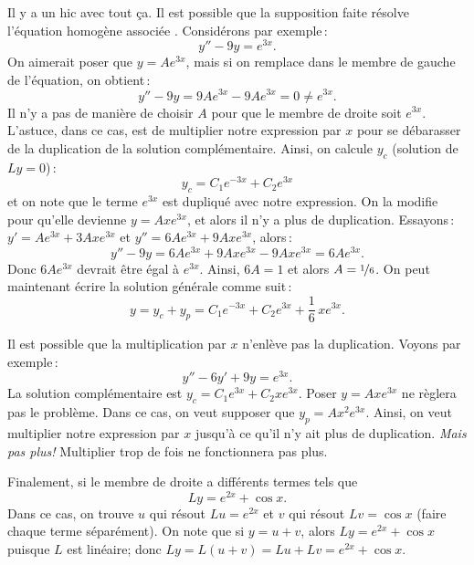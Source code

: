 \medskip

Il y a un hic avec tout ça. Il est possible que la supposition faite résolve l'équation homogène associée .  Considérons par exemple\,: 
\begin{equation*}
y'' - 9y = e^{3x} .
\end{equation*}
On aimerait poser que  $y = Ae^{3x}$, mais si on remplace dans le membre de gauche de l'équation, on obtient\,:  
\begin{equation*}
y''-9y = 9Ae^{3x} - 9Ae^{3x} = 0 \not= e^{3x} .
\end{equation*}
Il n'y a pas de manière de choisir $A$ pour que le membre de droite soit $e^{3x}$.
L'astuce, dans ce cas, est de multiplier notre expression par  $x$ pour se débarasser de la duplication de la solution complémentaire. Ainsi, on calcule  $y_c$ (solution de $Ly =
0$)\,: 
\begin{equation*}
y_c = C_1 e^{-3x} + C_2 e^{3x} 
\end{equation*}
et on note que le terme $e^{3x}$ est dupliqué avec notre expression. On la modifie pour qu'elle devienne  $y = Axe^{3x}$, et alors il n'y a plus de duplication. Essayons\,: 
$y' = Ae^{3x} + 3Axe^{3x}$ et 
$y'' = 6Ae^{3x} + 9Axe^{3x}$, alors\,: 
\begin{equation*}
y'' -9y = 6Ae^{3x} + 9Axe^{3x} - 9Axe^{3x} = 
6Ae^{3x} .
\end{equation*}
Donc $6Ae^{3x}$ devrait être égal à $e^{3x}$.  Ainsi,
$6A = 1$ et alors $A=\nicefrac{1}{6}$.  On peut maintenant écrire la solution générale comme suit\,: 
\begin{equation*}
y = y_c + y_p = 
C_1 e^{-3x} + C_2 e^{3x} + \frac{1}{6}\,xe^{3x} .
\end{equation*}

\medskip

Il est possible que la multiplication  par $x$ n'enlève pas la
duplication.  Voyons par exemple\,: 
\begin{equation*}
y''-6y'+9y = e^{3x} .
\end{equation*}
La solution complémentaire est
$y_c = C_1 e^{3x} + C_2 x e^{3x}$.  Poser $y=A xe^{3x}$
ne règlera pas le problème.  Dans ce cas, on veut supposer que 
$y_p = Ax^2e^{3x}$. Ainsi, on veut multiplier notre expression par  $x$
jusqu'à ce qu'il n'y ait plus de duplication. \emph{Mais pas plus!}  Multiplier trop de fois ne fonctionnera pas plus. 


\medskip

Finalement, si le membre de droite a différents termes tels que 
\begin{equation*}
Ly = e^{2x} + \cos x .
\end{equation*}
Dans ce cas, on trouve  $u$ qui résout $Lu = e^{2x}$ et $v$ qui résout $Lv = \cos x$ (faire chaque terme séparément).  On note que si $y = u+ v$, alors $Ly = e^{2x} + \cos x$ puisque 
$L$ est linéaire; donc 
$Ly = L(u+v) = Lu + Lv = e^{2x} + \cos x$.

